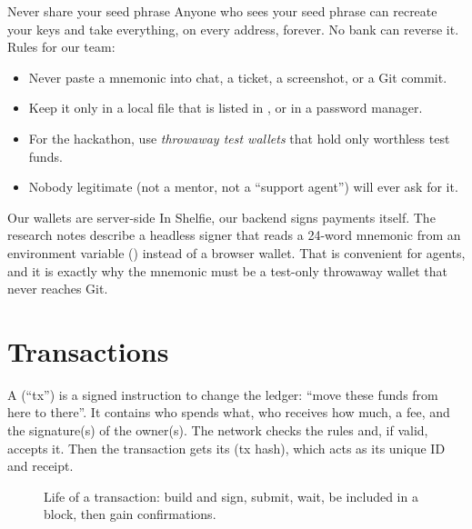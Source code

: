\begin{warningbox}{Never share your seed phrase}
Anyone who sees your seed phrase can recreate your keys and take everything, on every address, forever. No bank can reverse it. Rules for our team:
\begin{itemize}
  \item Never paste a mnemonic into chat, a ticket, a screenshot, or a Git commit.
  \item Keep it only in a local  file that is listed in , or in a password manager.
  \item For the hackathon, use \emph{throwaway test wallets} that hold only worthless test funds.
  \item Nobody legitimate (not a mentor, not a ``support agent'') will ever ask for it.
\end{itemize}
\end{warningbox}

\begin{shelfiebox}{Our wallets are server-side}
In Shelfie, our backend signs payments itself. The research notes describe a headless signer that reads a 24-word mnemonic from an environment variable () instead of a browser wallet. That is convenient for agents, and it is exactly why the mnemonic must be a test-only throwaway wallet that never reaches Git.
\end{shelfiebox}

\section{Transactions}

A  (``tx'') is a signed instruction to change the ledger: ``move these funds from here to there''. It contains who spends what, who receives how much, a fee, and the signature(s) of the owner(s). The network checks the rules and, if valid, accepts it. Then the transaction gets its  (tx hash), which acts as its unique ID and receipt.

\begin{figure}[h]
\centering
{}
\caption{Life of a transaction: build and sign, submit, wait, be included in a block, then gain confirmations.}
\end{figure}

